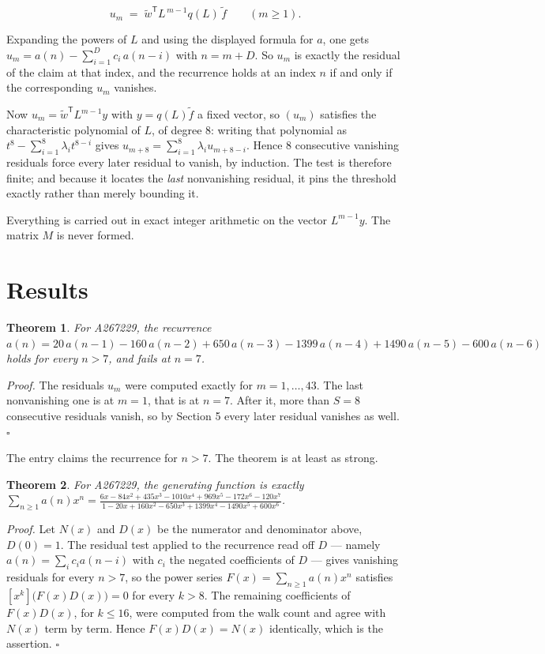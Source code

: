 \documentclass[11pt]{article}
\newtheorem{theorem}{Theorem}
\theoremstyle{definition}
\begin{document}
\[u_m \;=\; \tilde w^{\mathsf T} L^{\,m-1} q(L)\,\tilde f \qquad (m \ge 1).\]

Expanding the powers of $L$ and using the displayed formula for $a$, one gets $u_m = a(n) - \sum_{i=1}^{D} c_i\,a(n-i)$ with $n = m + D$. So $u_m$ is exactly the residual of the claim at that index, and the recurrence holds at an index $n$ if and only if the corresponding $u_m$ vanishes.

Now $u_m = \tilde w^{\mathsf T} L^{m-1} y$ with $y = q(L)\tilde f$ a fixed vector, so $(u_m)$ satisfies the characteristic polynomial of $L$, of degree $8$: writing that polynomial as $t^{8} - \sum_{i=1}^{8} \lambda_i t^{8-i}$ gives $u_{m+8} = \sum_{i=1}^{8} \lambda_i u_{m+8-i}$. Hence $8$ consecutive vanishing residuals force every later residual to vanish, by induction. The test is therefore finite; and because it locates the {\itshape last} nonvanishing residual, it pins the threshold exactly rather than merely bounding it.

Everything is carried out in exact integer arithmetic on the vector $L^{m-1}y$. The matrix $M$ is never formed.

\section{Results}

\begin{theorem} For A267229, the recurrence $a(n) = 20\,a(n-1) - 160\,a(n-2) + 650\,a(n-3) - 1399\,a(n-4) + 1490\,a(n-5) - 600\,a(n-6)$ holds for every $n > 7$, and fails at $n = 7$.\end{theorem}

{\itshape Proof.} The residuals $u_m$ were computed exactly for $m = 1,\dots,43$. The last nonvanishing one is at $m = 1$, that is at $n = 7$. After it, more than $S = 8$ consecutive residuals vanish, so by Section 5 every later residual vanishes as well. $\square$

The entry claims the recurrence for $n > 7$. The theorem is at least as strong.

\begin{theorem} For A267229, the generating function is exactly $\sum_{n\ge 1} a(n)x^n = \frac{6x - 84x^{2} + 435x^{3} - 1010x^{4} + 969x^{5} - 172x^{6} - 120x^{7}}{1 - 20x + 160x^{2} - 650x^{3} + 1399x^{4} - 1490x^{5} + 600x^{6}}$.\end{theorem}

{\itshape Proof.} Let $N(x)$ and $D(x)$ be the numerator and denominator above, $D(0)=1$. The residual test applied to the recurrence read off $D$ --- namely $a(n) = \sum_i c_i a(n-i)$ with $c_i$ the negated coefficients of $D$ --- gives vanishing residuals for every $n > 7$, so the power series $F(x)=\sum_{n\ge 1}a(n)x^n$ satisfies $[x^k]\bigl(F(x)D(x)\bigr) = 0$ for every $k > 8$. The remaining coefficients of $F(x)D(x)$, for $k \le 16$, were computed from the walk count and agree with $N(x)$ term by term. Hence $F(x)D(x) = N(x)$ identically, which is the assertion. $\square$
\end{document}

